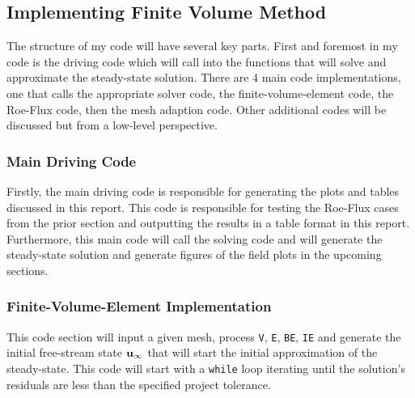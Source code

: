 \pagebreak
\subsection{Implementing Finite Volume Method}


The structure of my code will have several key parts. First and foremost in my code is the driving code which will call into the functions that will solve and approximate the steady-state solution. There are 4 main code implementations, one that calls the appropriate solver code, the finite-volume-element code, the Roe-Flux code, then the mesh adaption code. Other additional codes will be discussed but from a low-level perspective.

\subsubsection{Main Driving Code}
Firstly, the main driving code is responsible for generating the plots and tables discussed in this report. This code is responsible for testing the Roe-Flux cases from the prior section and outputting the results in a table format in this report. Furthermore, this main code will call the solving code and will generate the steady-state solution and generate figures of the field plots in the upcoming sections.


\subsubsection{Finite-Volume-Element Implementation}
This code section will input a given mesh, process {\texttt{V}}, {\texttt{E}}, {\texttt{BE}}, {\texttt{IE}} and generate the initial free-stream state $\bf u_\infty$ that will start the initial approximation of the steady-state. This code will start with a {\texttt{while}} loop iterating until the solution's residuals are less than the specified project tolerance.

